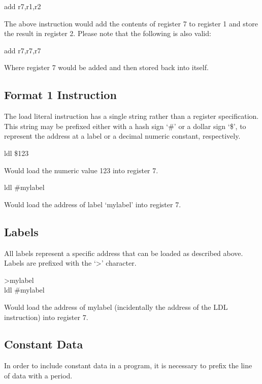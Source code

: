 \documentclass[12pt,letterpaper]{article}
\begin{document}
\begin{center}
add r7,r1,r2
\end{center}

The above instruction would add the contents of register 7 to register 1 and store the result in register 2. Please note that the following is also valid:

\begin{center}
add r7,r7,r7
\end{center}

Where register 7 would be added and then stored back into itself. 

\subsection{Format 1 Instruction}
The load literal instruction has a single string rather than a register specification. This string may be prefixed either with a hash sign `\#' or a dollar sign `\$', to represent the address at a label or a decimal numeric constant, respectively.

\begin{center}
ldl \$123
\end{center}

Would load the numeric value 123 into register 7.

\begin{center}
ldl \#mylabel
\end{center}

Would load the address of label `mylabel' into register 7.

\subsection{Labels}
All labels represent a specific address that can be loaded as described above. Labels are prefixed with the `\textgreater' character.

\begin{center}
\textgreater mylabel\\
ldl \#mylabel
\end{center}

Would load the address of mylabel (incidentally the address of the LDL instruction) into register 7.

\subsection{Constant Data}
In order to include constant data in a program, it is necessary to prefix the line of data with a period. 
\end{document}
